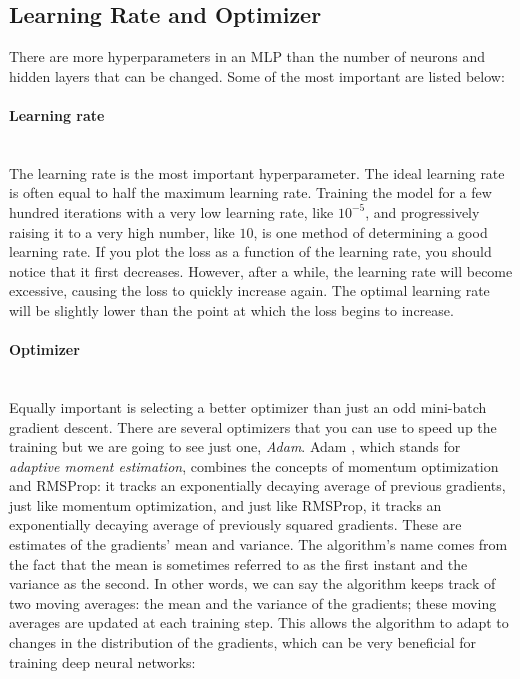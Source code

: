 \subsection{Learning Rate and Optimizer}
There are more hyperparameters in an MLP than the number of neurons and hidden layers that can be changed. Some of the most important are listed below:
\paragraph{Learning rate} \mbox{} \\
\noindent The learning rate is the most important hyperparameter. The ideal learning rate is often equal to half the maximum learning rate.  Training the model for a few hundred iterations with a very low learning rate, like $10^{-5}$, and progressively raising it to a very high number, like $10$, is one method of determining a good learning rate. If you plot the loss as a function of the learning rate, you should notice that it first decreases.
However, after a while, the learning rate will become excessive, causing the loss to quickly increase again. The optimal learning rate will be slightly lower than the point at which the loss begins to increase.

\paragraph{Optimizer}\mbox{}\\
Equally important is selecting a better optimizer than just an odd mini-batch gradient descent. There are several optimizers that you can use to speed up the training but we are going to see just one, \textit{Adam}.
Adam \parencite{kingma2014adam}, which stands for \textit{adaptive moment estimation}, combines the concepts of momentum optimization and RMSProp: it tracks an exponentially decaying average of previous gradients, just like momentum optimization, and just like RMSProp, it tracks an exponentially decaying average of previously squared gradients. These are estimates of the gradients' mean and variance. The algorithm's name comes from the fact that the mean is sometimes referred to as the first instant and the variance as the second.
In other words, we can say the algorithm keeps track of two moving averages: the mean and the variance of the gradients; these moving averages are updated at each training step. This allows the algorithm to adapt to changes in the distribution of the gradients, which can be very beneficial for training deep neural networks:

